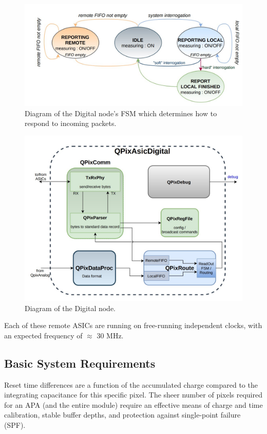 \begin{figure}[]
\centering
\includegraphics[width=\textwidth]{images/digital_fsm_overview.jpg}
\caption{Diagram of the Digital node's FSM which determines how to respond to incoming packets.}
\end{figure}


\begin{figure}[]
\centering
\includegraphics[width=\textwidth]{images/digital_node_overview.jpg}
\caption{Diagram of the Digital node.}
\end{figure}

Each of these remote ASICs are running on free-running independent clocks, with an expected frequency of $\approx$ 30 MHz.

\subsection{Basic System Requirements}

Reset time differences are a function of the accumulated charge compared to the integrating capacitance for this specific pixel.
The sheer number of pixels required for an APA (and the entire module) require an effective means of charge and time calibration, stable buffer depths, and protection against single-point failure (SPF). 

